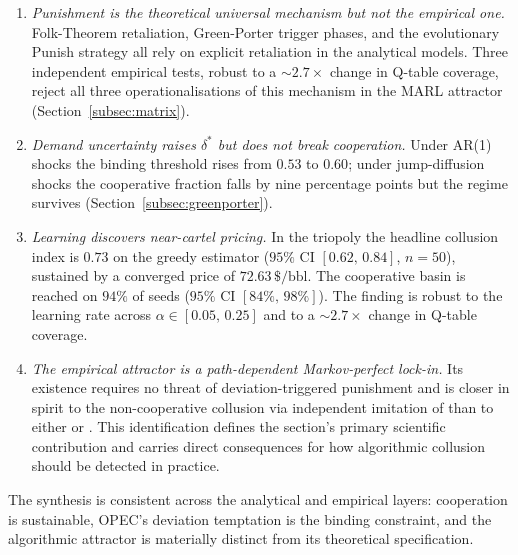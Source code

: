 \begin{enumerate}
  \item \emph{Punishment is the theoretical universal mechanism
        but not the empirical one.} Folk-Theorem retaliation,
        Green-Porter trigger phases, and the evolutionary
        Punish strategy all rely on explicit retaliation in the
        analytical models. Three independent empirical tests,
        robust to a ${\sim}2.7\times$ change in Q-table
        coverage, reject all three operationalisations of this
        mechanism in the MARL attractor
        (Section~\ref{subsec:matrix}).

  \item \emph{Demand uncertainty raises $\delta^\ast$ but does
        not break cooperation.} Under AR(1) shocks the binding
        threshold rises from $0.53$ to $0.60$; under
        jump-diffusion shocks the cooperative fraction falls by
        nine percentage points but the regime survives
        (Section~\ref{subsec:greenporter}).

  \item \emph{Learning discovers near-cartel pricing.} In the
        triopoly the headline collusion index is $0.73$ on the
        greedy estimator ($95\%$ CI $[0.62,\,0.84]$, $n = 50$),
        sustained by a converged price of
        $72.63\,\$\text{/bbl}$. The cooperative basin is
        reached on $94\%$ of seeds ($95\%$ CI
        $[84\%,\,98\%]$). The finding is robust to the learning
        rate across $\alpha \in [0.05,\,0.25]$ and to a
        ${\sim}2.7\times$ change in Q-table coverage.

  \item \emph{The empirical attractor is a path-dependent
        Markov-perfect lock-in.} Its existence requires no
        threat of deviation-triggered punishment and is closer
        in spirit to the non-cooperative collusion via
        independent imitation of \citet{vegaredondo1997} than
        to either \citet{abreu1986} or
        \citet{greenporter1984}. This identification defines
        the section's primary scientific contribution and
        carries direct consequences for how algorithmic
        collusion should be detected in practice.

\end{enumerate}

The synthesis is consistent across the analytical and empirical
layers: cooperation is sustainable, OPEC's deviation temptation
is the binding constraint, and the algorithmic attractor is
materially distinct from its theoretical specification.

